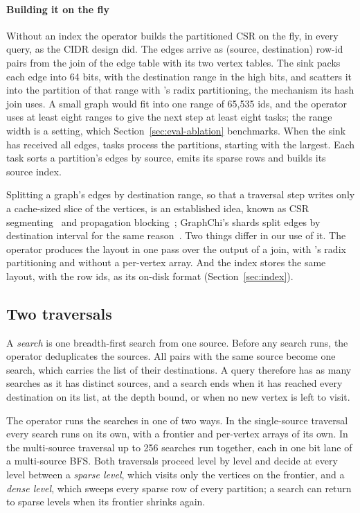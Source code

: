 \paragraph{Building it on the fly} Without an index the operator builds the partitioned CSR on the fly, in every
query, as the CIDR design did. The edges arrive as (source, destination) row-id pairs from the join of the edge table
with its two vertex tables. The sink packs each edge into 64 bits, with the destination range in the high bits, and
scatters it into the partition of that range with \duckdb's radix partitioning, the mechanism its hash join uses. A
small graph would fit into one range of 65,535 ids, and the operator uses at least eight ranges to give the next
step at least eight tasks; the range width is a setting, which Section~\ref{sec:eval-ablation} benchmarks. When the
sink has received all edges, tasks process the partitions, starting with the largest. Each task sorts a partition's
edges by source, emits its sparse rows and builds its source index.

Splitting a graph's edges by destination range, so that a traversal step writes only a cache-sized slice of the
vertices, is an established idea, known as CSR segmenting~\cite{zhang2017cagra} and propagation
blocking~\cite{beamer2017blocking}; GraphChi's shards split edges by destination interval for the same
reason~\cite{kyrola2012graphchi}. Two things differ in our use of it. The operator produces the layout in one pass
over the output of a join, with \duckdb's radix partitioning and without a per-vertex array. And the index stores the
same layout, with the row ids, as its on-disk format (Section~\ref{sec:index}).

\subsection{Two traversals}
\label{sec:traversals}

A \emph{search} is one breadth-first search from one source. Before any search runs, the operator deduplicates the
sources. All pairs with the same source become one search, which carries the list of their destinations. A query
therefore has as many searches as it has distinct sources, and a search ends when it has reached every destination
on its list, at the depth bound, or when no new vertex is left to visit.

The operator runs the searches in one of two ways. In the single-source traversal every search runs on its own, with a
frontier and per-vertex arrays of its own. In the multi-source traversal up to 256 searches run together, each in one
bit lane of a multi-source BFS. Both traversals proceed level by level and decide at every level between a
\emph{sparse level}, which visits only the vertices on the frontier, and a \emph{dense level}, which sweeps every
sparse row of every partition; a search can return to sparse levels when its frontier shrinks again.

